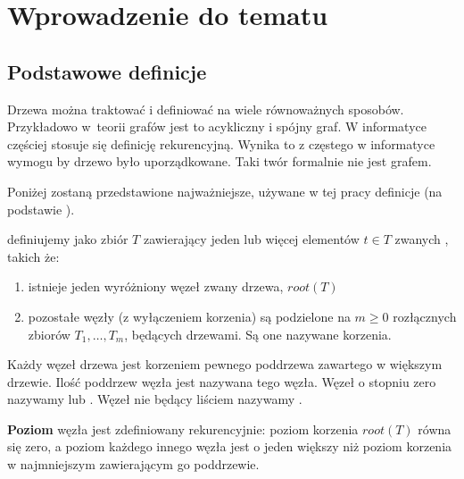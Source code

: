 \chapter{Wprowadzenie do tematu}



\section{Podstawowe definicje}

Drzewa można traktować i definiować na wiele równoważnych sposobów.
Przykładowo w~teorii grafów jest to acykliczny i spójny graf.
W informatyce częściej stosuje się definicję rekurencyjną.
Wynika to z częstego w informatyce wymogu by drzewo było uporządkowane.
Taki twór formalnie nie jest grafem.


Poniżej zostaną przedstawione najważniejsze, używane w tej pracy definicje (na podstawie \cite{knuth}).


  definiujemy jako zbiór $T$ zawierający jeden lub więcej elementów $t \in T$ zwanych  , takich że:

\begin{enumerate}
 \item
    istnieje jeden wyróżniony węzeł zwany  drzewa, $root(T)$
 \item
    pozostałe węzły (z wyłączeniem korzenia) są podzielone na $m \geq 0$ rozłącznych zbiorów $T_{1},\ldots, T_{m}$,
	będących drzewami. Są one nazywane   korzenia.
\end{enumerate}

Każdy węzeł drzewa jest korzeniem pewnego poddrzewa zawartego w większym drzewie.
Ilość poddrzew węzła jest nazywana   tego węzła.
Węzeł o stopniu zero nazywamy   lub  . 
Węzeł nie będący liściem nazywamy  .







\textbf{Poziom}  węzła jest zdefiniowany rekurencyjnie: poziom korzenia $root(T)$ równa się zero,
a poziom każdego innego węzła jest o jeden większy niż poziom korzenia w najmniejszym 
 zawierającym go poddrzewie.
%
%

